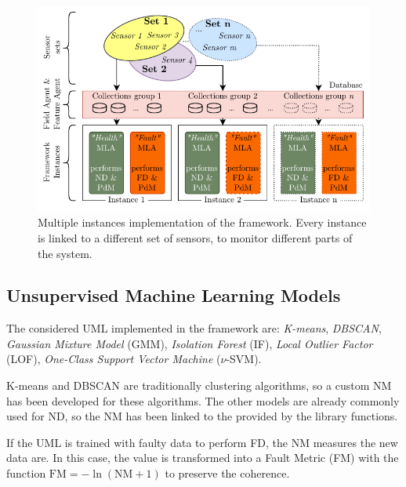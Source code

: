 \begin{figure}
    \includegraphics[width=\linewidth]{images/FrameworkInstances.pdf}
    \caption{Multiple instances implementation of the framework. Every instance is linked to a different set of sensors, to monitor different parts of the system.}
    \label{fig:multiple_instances}
\end{figure}


\subsection{Unsupervised Machine Learning Models}

The considered UML implemented in the framework are: \emph{K-means}, \emph{DBSCAN}, \emph{Gaussian Mixture Model} (GMM), \emph{Isolation Forest} (IF), \emph{Local Outlier Factor} (LOF), \emph{One-Class Support Vector Machine} ($\nu$-SVM).

K-means and DBSCAN are traditionally clustering algorithms, so a custom NM has been developed for these algorithms. The other models are already commonly used for ND, so the NM has been linked to the  provided by the library functions.

If the UML is trained with faulty data to perform FD, the NM measures  the new data are. In this case, the value is transformed into a Fault Metric (FM) with the function $\text{FM} = - \ln(\text{NM} + 1)$ to preserve the coherence. 